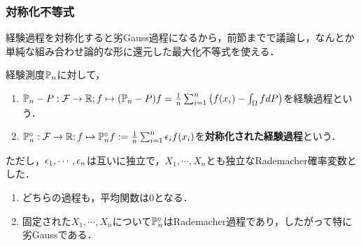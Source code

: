 \documentclass[uplatex,dvipdfmx]{jsreport}
\begin{document}
\subsubsection{対称化不等式}

\begin{tcolorbox}[colframe=ForestGreen, colback=ForestGreen!10!white,breakable,colbacktitle=ForestGreen!40!white,coltitle=black,fonttitle=\bfseries\sffamily,
title=]
    経験過程を対称化すると劣Gauss過程になるから，前節までで議論し，なんとか単純な組み合わせ論的な形に還元した最大化不等式を使える．
\end{tcolorbox}

\begin{definition}
    経験測度$\mathbb{P}_n$に対して，
    \begin{enumerate}
        \item $\mathbb{P}_n-P:\mathcal{F}\to\mathbb{R};f\mapsto (\mathbb{P}_n-P)f=\frac{1}{n}\sum^n_{i=1}\left(f(x_i)-\int_\Omega fdP\right)$を経験過程という．
        \item $\mathbb{P}_n^\circ:\mathcal{F}\to\mathbb{R};f\mapsto\mathbb{P}_n^\circ f:=\frac{1}{n}\sum^n_{i=1}\epsilon_if(x_i)$を\textbf{対称化された経験過程}という．
    \end{enumerate}
    ただし，$\epsilon_1,\cdots,\epsilon_n$は互いに独立で，$X_1,\cdots,X_n$とも独立なRademacher確率変数とした．
\end{definition}

\begin{lemma}[経験過程を対称化すると劣Gaussである]\mbox{}
    \begin{enumerate}
        \item どちらの過程も，平均関数は$0$となる．
        \item 固定された$X_1,\cdots,X_n$について$\mathbb{P}_n^\circ$はRademacher過程であり，したがって特に劣Gaussである．
    \end{enumerate}
\end{lemma}
\end{document}
